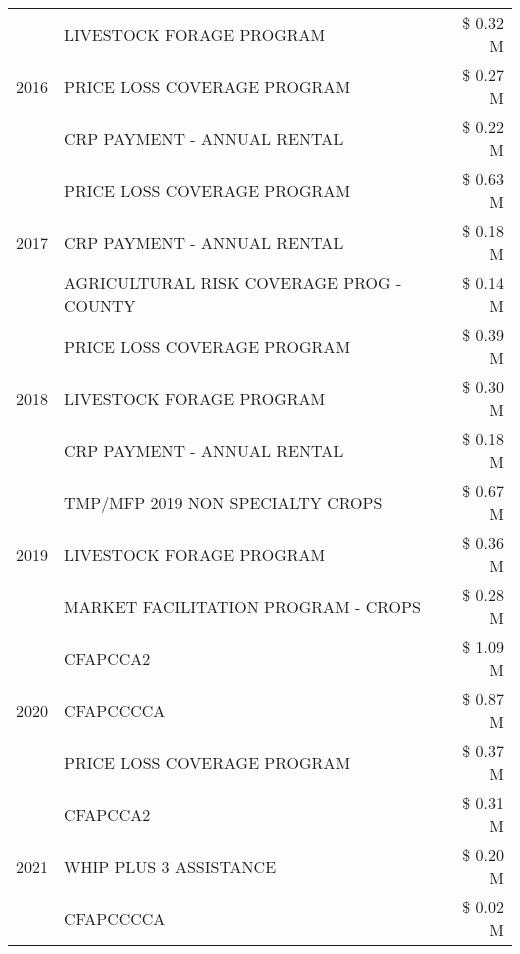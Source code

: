 \begin{tabular}{llr}
\cline{1-3}
\multirow[t]{3}{*}{2016} & LIVESTOCK FORAGE PROGRAM & \$ 0.32 M \\
 & PRICE LOSS COVERAGE PROGRAM & \$ 0.27 M \\
 & CRP PAYMENT - ANNUAL RENTAL & \$ 0.22 M \\
\cline{1-3}
\multirow[t]{3}{*}{2017} & PRICE LOSS COVERAGE PROGRAM & \$ 0.63 M \\
 & CRP PAYMENT - ANNUAL RENTAL & \$ 0.18 M \\
 & AGRICULTURAL RISK COVERAGE PROG - COUNTY & \$ 0.14 M \\
\cline{1-3}
\multirow[t]{3}{*}{2018} & PRICE LOSS COVERAGE PROGRAM & \$ 0.39 M \\
 & LIVESTOCK FORAGE PROGRAM & \$ 0.30 M \\
 & CRP PAYMENT - ANNUAL RENTAL & \$ 0.18 M \\
\cline{1-3}
\multirow[t]{3}{*}{2019} & TMP/MFP 2019 NON SPECIALTY CROPS & \$ 0.67 M \\
 & LIVESTOCK FORAGE PROGRAM & \$ 0.36 M \\
 & MARKET FACILITATION PROGRAM - CROPS & \$ 0.28 M \\
\cline{1-3}
\multirow[t]{3}{*}{2020} & CFAPCCA2 & \$ 1.09 M \\
 & CFAPCCCCA & \$ 0.87 M \\
 & PRICE LOSS COVERAGE PROGRAM & \$ 0.37 M \\
\cline{1-3}
\multirow[t]{3}{*}{2021} & CFAPCCA2 & \$ 0.31 M \\
 & WHIP PLUS 3 ASSISTANCE & \$ 0.20 M \\
 & CFAPCCCCA & \$ 0.02 M \\
\cline{1-3}
\bottomrule
\end{tabular}
